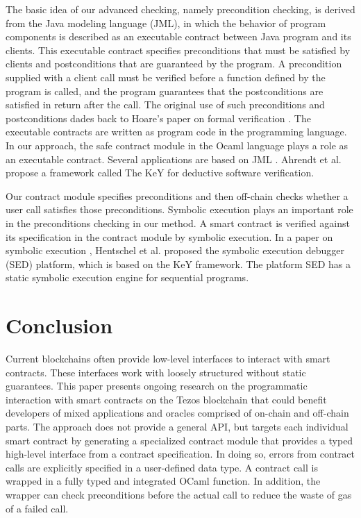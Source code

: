 \documentclass[a4paper,USenglish,american,cleveref, autoref, thm-restate]{oasics-v2021}
\begin{document}
The basic idea of our advanced checking, namely precondition checking, is derived from the Java modeling language (JML)\cite{Leavens2006DesignBC, 101007}, in which the behavior of program components is described as an executable contract between Java program and its clients. This executable contract specifies preconditions that must be satisfied by clients and postconditions that are guaranteed by the program. A precondition supplied with a client call must be verified  before a function defined by the program is called, and the program guarantees that the postconditions are satisfied in return after the call. The original use of such preconditions and postconditions dades back to Hoare's paper on formal verification \cite{101145}. The executable contracts are written as program code in the programming language. In our approach, the safe contract module in the Ocaml language plays a role as an executable contract. Several applications are based on JML \cite{Tran2017, keY}. Ahrendt et al. \cite{keY} propose a framework called The KeY for deductive software verification. 

Our contract module specifies preconditions and then off-chain checks whether a user call satisfies those preconditions. Symbolic execution plays an important role in the preconditions checking in our method. A smart contract is verified against its specification in the contract module by symbolic execution. In a paper on symbolic execution \cite{Hentschel}, Hentschel et al. proposed the symbolic execution debugger (SED) platform, which is based on the KeY framework. The platform SED has a static symbolic execution engine for sequential programs.

\section{Conclusion}
\label{sec:conclusion}

Current blockchains often provide low-level interfaces to interact
with smart contracts. These interfaces work with loosely structured
without static guarantees. This paper presents ongoing research on the
programmatic interaction with smart contracts on the Tezos blockchain
that could benefit developers of mixed applications and
oracles comprised of on-chain and off-chain parts. The approach does
not provide a general API, but targets each 
individual smart contract by generating a specialized contract module
that provides a typed high-level interface from a contract
specification. In doing so, errors from contract calls are explicitly
specified in a user-defined data type. A contract call is wrapped in a
fully typed and integrated OCaml function. In addition, the wrapper can check preconditions before the 
actual call to reduce the waste of gas of a failed call.






\end{document}
